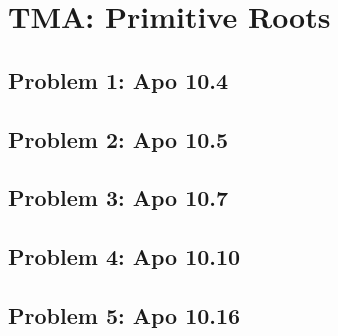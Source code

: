 \section{TMA: Primitive Roots}

\subsection[Problem 1]{Problem 1: Apo 10.4}

\subsection[Problem 2]{Problem 2: Apo 10.5}

\subsection[Problem 3]{Problem 3: Apo 10.7}

\subsection[Problem 4]{Problem 4: Apo 10.10}

\subsection[Problem 5]{Problem 5: Apo 10.16}